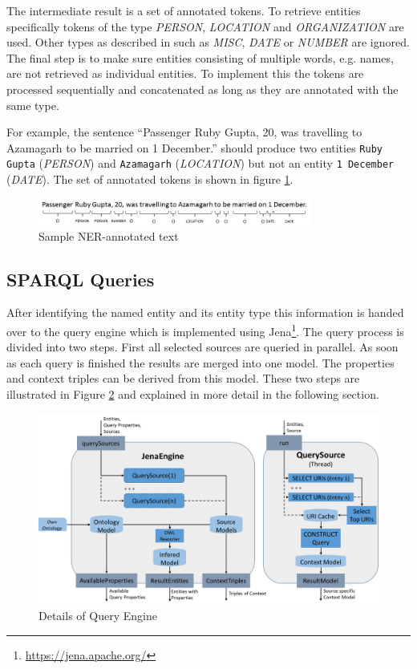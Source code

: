 The intermediate result is a set of annotated tokens. To retrieve entities specifically tokens of the type \textit{PERSON}, \textit{LOCATION} and \textit{ORGANIZATION} are used. Other types as described in \cite{CoreNLP_NER} such as \textit{MISC}, \textit{DATE} or \textit{NUMBER} are ignored. The final step is to make sure entities consisting of multiple words, e.g. names, are not retrieved as individual entities. To implement this the tokens are processed sequentially and concatenated as long as they are annotated with the same type. 

For example, the sentence ``Passenger Ruby Gupta, 20, was travelling to Azamagarh to be married on 1 December.'' should produce two entities \texttt{Ruby Gupta} (\textit{PERSON}) and \texttt{Azamagarh} (\textit{LOCATION}) but not an entity \texttt{1 December} (\textit{DATE}). The set of annotated tokens is shown in figure \ref{fig:nerExample}. 

 \begin{figure}[ht]
	\centering
	\includegraphics[width=0.8\textwidth]{img/nerExample}
	\caption{Sample NER-annotated text}
	\label{fig:nerExample}
\end{figure}
 




\subsection{SPARQL Queries}
\label{sec:sparqlQueries}
After identifying the named entity and its entity type this information is handed over to the query engine which is implemented using Jena\footnote{\url{https://jena.apache.org/}}. The query process is divided into two steps. First all selected sources are queried in parallel. As soon as each query is finished the results are merged into one model. The properties and context triples can be derived from this model. These two steps are illustrated in Figure \ref{fig:details_query} and explained in more detail in the following section.
\begin{figure}[ht]
	\centering
	\includegraphics[width=1\textwidth]{img/QueryEngineDetails}
	\caption{Details of Query Engine}
	\label{fig:details_query}
\end{figure}

